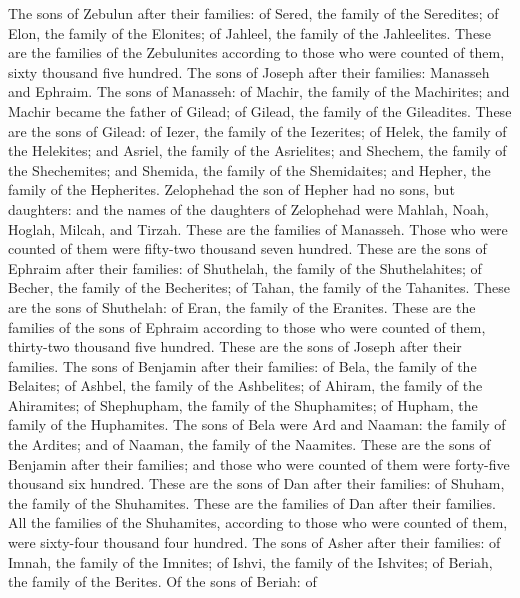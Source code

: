 The sons of Zebulun after their families: of Sered, the family of the
Seredites; of Elon, the family of the Elonites; of Jahleel, the family
of the Jahleelites.  These are the families of the
Zebulunites according to those who were counted of them, sixty thousand
five hundred.  The sons of Joseph after their families:
Manasseh and Ephraim.  The sons of Manasseh: of Machir, the
family of the Machirites; and Machir became the father of Gilead; of
Gilead, the family of the Gileadites.  These are the sons
of Gilead: of Iezer, the family of the Iezerites; of Helek, the family
of the Helekites;  and Asriel, the family of the
Asrielites; and Shechem, the family of the Shechemites; 
and Shemida, the family of the Shemidaites; and Hepher, the family of
the Hepherites.  Zelophehad the son of Hepher had no sons,
but daughters: and the names of the daughters of Zelophehad were Mahlah,
Noah, Hoglah, Milcah, and Tirzah.  These are the families
of Manasseh. Those who were counted of them were fifty-two thousand
seven hundred.  These are the sons of Ephraim after their
families: of Shuthelah, the family of the Shuthelahites; of Becher, the
family of the Becherites; of Tahan, the family of the Tahanites.
 These are the sons of Shuthelah: of Eran, the family of
the Eranites.  These are the families of the sons of
Ephraim according to those who were counted of them, thirty-two thousand
five hundred. These are the sons of Joseph after their families.
 The sons of Benjamin after their families: of Bela, the
family of the Belaites; of Ashbel, the family of the Ashbelites; of
Ahiram, the family of the Ahiramites;  of Shephupham, the
family of the Shuphamites; of Hupham, the family of the Huphamites.
 The sons of Bela were Ard and Naaman: the family of the
Ardites; and of Naaman, the family of the Naamites.  These
are the sons of Benjamin after their families; and those who were
counted of them were forty-five thousand six hundred. 
These are the sons of Dan after their families: of Shuham, the family of
the Shuhamites. These are the families of Dan after their families.
 All the families of the Shuhamites, according to those who
were counted of them, were sixty-four thousand four hundred.
 The sons of Asher after their families: of Imnah, the
family of the Imnites; of Ishvi, the family of the Ishvites; of Beriah,
the family of the Berites.  Of the sons of Beriah: of
